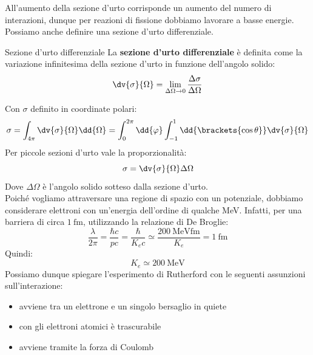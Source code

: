 All'aumento della sezione d'urto corrisponde un aumento del numero di interazioni, dunque per reazioni di fissione dobbiamo lavorare a basse energie.\\
Possiamo anche definire una sezione d'urto differenziale.
\begin{definition}{Sezione d'urto differenziale}
    La \textbf{sezione d'urto differenziale} è definita come la variazione infinitesima della sezione d'urto in funzione dell'angolo solido:
    \begin{equation}
     \dv{\sigma}{\Omega} = \lim_{\Delta \Omega \to 0} \dfrac{\Delta \sigma}{\Delta \Omega}
    \end{equation}
\end{definition}
Con $\sigma$ definito in coordinate polari:
\begin{equation}
 \sigma = \int_{4 \pi} \dv{\sigma}{\Omega} \dd{\Omega} = \int_0^{2\pi} \dd{\varphi} \int_{-1}^{1} \dd{\brackets{\cos \theta}} \dv{\sigma}{\Omega}
\end{equation}
Per piccole sezioni d'urto vale la proporzionalità:
\begin{equation}
 \sigma = \dv{\sigma}{\Omega} \Delta \Omega
\end{equation}
Dove $\Delta \Omega$ è l'angolo solido sotteso dalla sezione d'urto.\\
Poiché vogliamo attraversare una regione di spazio con un potenziale, dobbiamo considerare elettroni con un'energia dell'ordine di qualche \si{\mega\electronvolt}. Infatti, per una barriera di circa $\qty{1}{\femto\meter}$, utilizzando la relazione di De Broglie:
\begin{equation}
 \dfrac{\lambda}{2 \pi} = \dfrac{\hbar c}{p c} = \dfrac{\hbar}{K_ec} \simeq \dfrac{\qty{200}{\mega\electronvolt\femto\meter}}{K_e} = \qty{1}{\femto\meter}
\end{equation}
Quindi:
\begin{equation}
 K_e \simeq \qty{200}{\mega\electronvolt}
\end{equation}
Possiamo dunque spiegare l'esperimento di Rutherford con le seguenti assunzioni sull'interazione:
\begin{itemize}
 \item avviene tra un elettrone e un singolo bersaglio in quiete
 \item con gli elettroni atomici è trascurabile
 \item avviene tramite la forza di Coulomb
\end{itemize}


